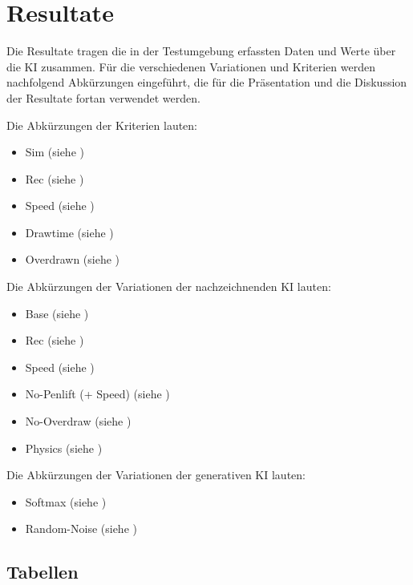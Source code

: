 \chapter{Resultate}\label{chap:r} 

Die Resultate tragen die in der Testumgebung erfassten Daten und Werte über die
KI zusammen. Für die verschiedenen Variationen und Kriterien werden nachfolgend
Abkürzungen eingeführt, die für die Präsentation und die Diskussion der
Resultate fortan verwendet werden.

Die Abkürzungen der Kriterien lauten:
\begin{itemize}
    \item Sim (siehe )
    \item Rec (siehe )
    \item Speed (siehe )
    \item Drawtime  (siehe )
    \item Overdrawn (siehe )
\end{itemize}

Die Abkürzungen der Variationen der nachzeichnenden KI lauten: 
\begin{itemize}
    \item Base (siehe )
    \item Rec (siehe )
    \item Speed (siehe )
    \item No-Penlift (+ Speed) (siehe )
    \item No-Overdraw (siehe )
    \item Physics (siehe )
\end{itemize}

Die Abkürzungen der Variationen der generativen KI lauten:
\begin{itemize}
    \item Softmax (siehe )
    \item Random-Noise (siehe )
\end{itemize}



\section{Tabellen}\label{chap:r_tab} 

